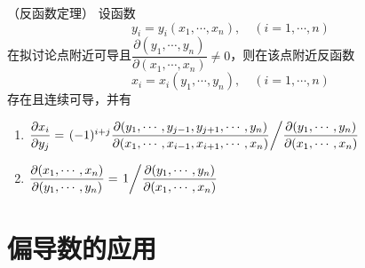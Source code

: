 \begin{theorem}
    （反函数定理）
    \label{th:反函数定理}
    设函数
    \[ y_i=y_i(x_1,\cdots,x_n),\quad (i=1,\cdots,n) \]
    在拟讨论点附近可导且$\dfrac{\partial(y_1,\cdots,y_n)}{\partial(x_1,\cdots,x_n)}\neq 0$，则在该点附近反函数
    \[ x_i = x_i(y_1,\cdots,y_n),\quad (i=1,\cdots,n) \]
    存在且连续可导，并有
    \begin{enumerate}[(1)]
        \item
              $
                  \dfrac{\partial x_i}{\partial y_j}
                  = \left.(-1)^{i+j} \dfrac{\partial(y_1,\cdots,y_{j-1},y_{j+1},\cdots,y_n)}{\partial(x_1,\cdots,x_{i-1},x_{i+1},\cdots,x_n)}
                  \middle/
                  \dfrac{\partial(y_1,\cdots,y_n)}{\partial(x_1,\cdots,x_n)}
                  \right.
              $
        \item
              $
                  \dfrac{\partial(x_1,\cdots,x_n)}{\partial(y_1,\cdots,y_n)} = \left.1\middle/\dfrac{\partial(y_1,\cdots,y_n)}{\partial(x_1,\cdots,x_n)}\right.
              $
    \end{enumerate}
\end{theorem}

\section{偏导数的应用}